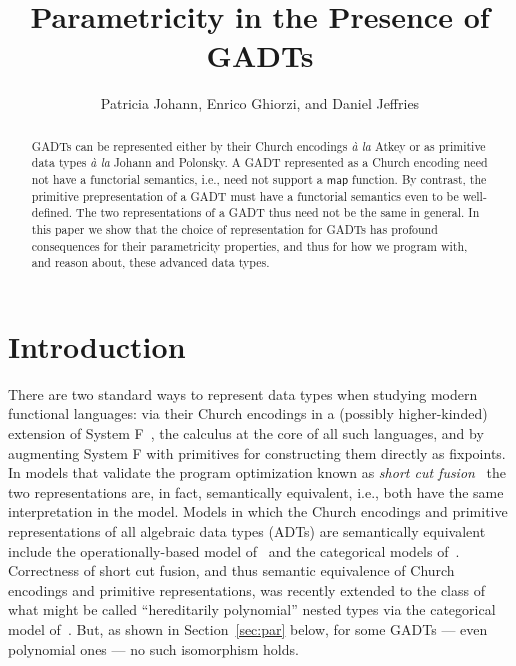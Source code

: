 \documentclass[acmsmall,screen,review,anonymous]{acmart}
\title[Parametricity in the Presence of GADTs]{Parametricity in the
  Presence of GADTs}
\author{Patricia Johann, Enrico Ghiorzi, and Daniel Jeffries}
\affiliation{ \institution{Appalachian State University}}
\theoremstyle{definition}
\begin{document}
\begin{abstract}
GADTs can be represented either by their Church encodings {\em \`a la}
Atkey or as primitive data types {\em \`a la} Johann and Polonsky.  A
GADT represented as a Church encoding need not have a functorial
semantics, i.e., need not support a $\mathsf{map}$ function. By
contrast, the primitive prepresentation of a GADT must have a
functorial semantics even to be well-defined. The two representations
of a GADT thus need not be the same in general. In this paper we show
that the choice of representation for GADTs has profound consequences
for their parametricity properties, and thus for how we program with,
and reason about, these advanced data types.
\end{abstract}

\maketitle

\section{Introduction}\label{sec:intro}

There are two standard ways to represent data types when studying
modern functional languages: via their Church encodings in a (possibly
higher-kinded) extension of System F~\cite{gir72}, the calculus at the
core of all such languages, and by augmenting System F
with primitives for constructing them directly as fixpoints.
In models that validate the program optimization known as {\em short
  cut fusion}~\cite{glp93} the two representations are, in fact,
semantically equivalent, i.e., both have the same interpretation in
the model. Models in which the Church encodings and primitive
representations of all algebraic data types (ADTs) are semantically
equivalent include the operationally-based model of~\cite{pit98,pit00}
and the categorical models of~\cite{joh02,joh03}.
Correctness of short cut fusion, and thus semantic equivalence of
Church encodings and primitive representations, was recently extended
to the class of what might be called ``hereditarily polynomial''
nested types via the categorical model of~\cite{jgj21}. But, as shown
in Section~\ref{sec:par} below, for some GADTs --- even polynomial
ones --- no such isomorphism holds.
\end{document}
